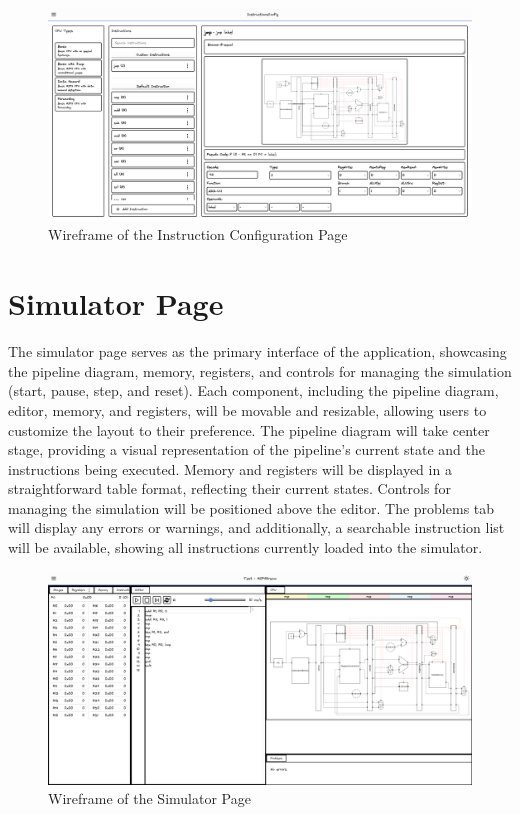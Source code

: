 \begin{figure}[H]
    \centering
    \includegraphics[width=1\textwidth]{assets/images/instruction_config_wireframe.png}
    \caption{Wireframe of the Instruction Configuration Page}
    \label{fig:instruction_config_wireframe}
\end{figure}

\section{Simulator Page}
The simulator page serves as the primary interface of the application, showcasing the pipeline diagram, memory, registers, and controls for managing the simulation (start, pause, step, and reset). Each component, including the pipeline diagram, editor, memory, and registers, will be movable and resizable, allowing users to customize the layout to their preference. The pipeline diagram will take center stage, providing a visual representation of the pipeline's current state and the instructions being executed. Memory and registers will be displayed in a straightforward table format, reflecting their current states. Controls for managing the simulation will be positioned above the editor. The problems tab will display any errors or warnings, and additionally, a searchable instruction list will be available, showing all instructions currently loaded into the simulator.

\begin{figure}[H]
    \centering
    \includegraphics[width=1\textwidth]{assets/images/simulator_wireframe.png}
    \caption{Wireframe of the Simulator Page}
    \label{fig:simulator_wireframe}
\end{figure}


